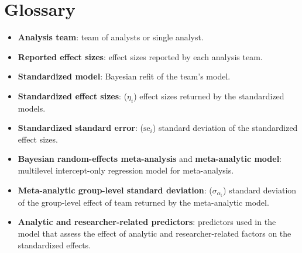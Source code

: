 \documentclass[Review,times,sageh]{sagej}
\providecommand{\tightlist}{\setlength{\itemsep}{0pt}\setlength{\parskip}{0pt}}
\begin{document}
\appendix

\hypertarget{glossary}{%
\section{Glossary}\label{glossary}}

\begin{itemize}
\tightlist
\item
  \textbf{Analysis team}: team of analysts or single analyst.
\item
  \textbf{Reported effect sizes}: effect sizes reported by each analysis team.
\item
  \textbf{Standardized model}: Bayesian refit of the team's model.
\item
  \textbf{Standardized effect sizes}: (\(\eta_i\)) effect sizes returned by the standardized models.
\item
  \textbf{Standardized standard error}: (\(\text{se}_i\)) standard deviation of the standardized effect sizes.
\item
  \textbf{Bayesian random-effects meta-analysis} and \textbf{meta-analytic model}: multilevel intercept-only regression model for meta-analysis.
\item
  \textbf{Meta-analytic group-level standard deviation}: (\(\sigma_{\alpha_{\text{t}}}\)) standard deviation of the group-level effect of team returned by the meta-analytic model.
\item
  \textbf{Analytic and researcher-related predictors}: predictors used in the model that assess the effect of analytic and researcher-related factors on the standardized effects.
\end{itemize}



\end{document}
